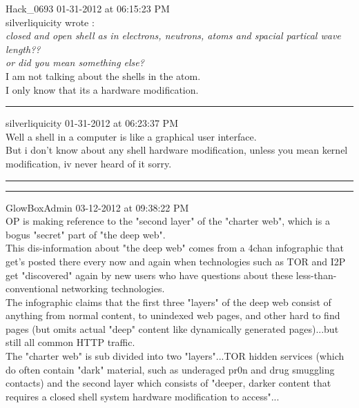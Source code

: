 \documentclass[11pt,twoside,a4paper]{book}
\begin{document}
\begin{multicols*}{2}
Hack\_0693 01-31-2012 at 06:15:23 PM~\\

silverliquicity wrote :~\\

\emph{closed and open shell as in electrons, neutrons, atoms and spacial partical wave length??}~\\

\emph{or did you mean something else?}~\\

I am not talking about the shells in the atom.~\\
I only know that its a hardware modification.

\begin{center} \rule{0.45\textwidth}{0.01cm} \end{center}

silverliquicity 01-31-2012 at 06:23:37 PM~\\

Well a shell in a computer is like a graphical user interface.~\\

But i don't know about any shell hardware modification, unless you mean kernel modification, iv never heard of it sorry.

\begin{center} \rule{0.45\textwidth}{0.01cm} \end{center}

\vfill
\columnbreak

\begin{center} \rule{0.45\textwidth}{0.01cm} \end{center}

GlowBoxAdmin 03-12-2012 at 09:38:22 PM~\\

OP is making reference to the "second layer" of the "charter web", which is a bogus "secret" part of "the deep web".~\\
This dis-information about "the deep web" comes from a 4chan infographic that get's posted there every now and again when technologies such as TOR and I2P get "discovered" again by new users who have questions about these less-than-conventional networking technologies.~\\
The infographic claims that the first three "layers" of the deep web consist of anything from normal content, to unindexed web pages, and other hard to find pages (but omits actual "deep" content like dynamically generated pages)...but still all common HTTP traffic.~\\
The "charter web" is sub divided into two "layers"...TOR hidden services (which do often contain "dark" material, such as underaged pr0n and drug smuggling contacts) and the second layer which consists of "deeper, darker content that requires a closed shell system hardware modification to access"...~\\


\end{multicols*}
\end{document}
